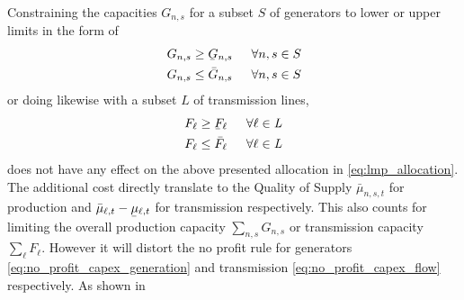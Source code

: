 \documentclass[11pt,twocolumn]{article}
\newcommand{\ubar}[1]{\underaccent{\bar}{#1}}
\newcommand{\hpad}{\hspace{15pt}}
\newcommand{\capacityGeneration}{G_{n,s}}
\newcommand{\capacityGenerationUpper}{\bar{G}_{n,s}}
\newcommand{\capacityGenerationLower}{\ubar{G}_{n,s}}
\newcommand{\capacityFlow}{F_{\ell}}
\newcommand{\capacityFlowUpper}{\bar{F}_{\ell}}
\newcommand{\capacityFlowLower}{\ubar{F}_{\ell}}
\newcommand{\muuppergeneration}[1][n]{\bar{\mu}_{#1,s,t}}
\newcommand{\mulowerflow}{\ubar{\mu}_{\ell,t}}
\newcommand{\muupperflow}{\bar{\mu}_{\ell,t}}
\begin{document}
Constraining the capacities $\capacityGeneration$  for a subset $S$ of generators to lower or upper limits in the form of 
\begin{align}
\capacityGeneration \ge \capacityGenerationLower \hpad \forall{n,s \in S} \\
\capacityGeneration \le \capacityGenerationUpper \hpad \forall{n,s \in S}
\end{align}
or doing likewise with a subset $L$ of transmission lines,
\begin{align}
\capacityFlow \ge \capacityFlowLower \hpad \forall{\ell \in \textit{L}} \\
\capacityFlow \le \capacityFlowUpper \hpad \forall{\ell \in \textit{L}}
\end{align}
does not have any effect on the above presented allocation in \cref{eq:lmp_allocation}. The additional cost directly translate to the Quality of Supply $\muuppergeneration$ for production and $\muupperflow - \mulowerflow$ for transmission respectively. This also counts for limiting the overall production capacity $\sum_{n,s}\capacityGeneration$ or transmission capacity $\sum_\ell \capacityFlow$. However it will distort the no profit rule for generators \cref{eq:no_profit_capex_generation} and transmission \cref{eq:no_profit_capex_flow} respectively. As shown in \cite{brown_decreasing_2020}
\end{document}
